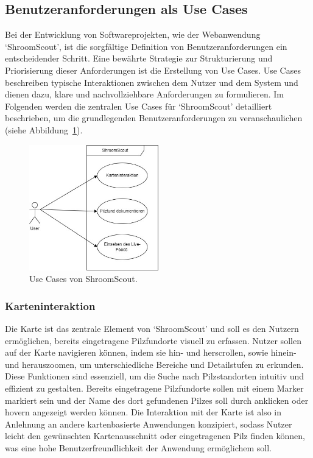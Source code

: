 \documentclass[../main.tex]{subfiles} %
\begin{document}
\subsection{Benutzeranforderungen als Use Cases}

Bei der Entwicklung von Softwareprojekten, wie der Webanwendung `ShroomScout', ist die sorgfältige Definition von
Benutzeranforderungen ein entscheidender Schritt. Eine bewährte Strategie zur Strukturierung und Priorisierung dieser
Anforderungen ist die Erstellung von Use Cases. Use Cases beschreiben typische Interaktionen zwischen dem Nutzer und
dem System und dienen dazu, klare und nachvollziehbare Anforderungen zu formulieren. Im Folgenden werden die zentralen
Use Cases für `ShroomScout' detailliert beschrieben, um die grundlegenden Benutzeranforderungen zu veranschaulichen
(siehe Abbildung~\ref{fig:UseCase_Diagramm}).

\begin{figure}[ht]
	\centering
	\includegraphics[width=0.5\textwidth]{abbildungen/UseCaseDiagrammDrawio.jpg}
	\caption{Use Cases von ShroomScout.}
	\label{fig:UseCase_Diagramm}
\end{figure}

\subsubsection{Karteninteraktion}

Die Karte ist das zentrale Element von `ShroomScout' und soll es den Nutzern ermöglichen, bereits eingetragene Pilzfundorte
visuell zu erfassen. Nutzer sollen auf der Karte navigieren können, indem sie hin- und herscrollen, sowie hinein- und herauszoomen,
um unterschiedliche Bereiche und Detailstufen zu erkunden. Diese Funktionen sind essenziell, um die Suche nach Pilzstandorten
intuitiv und effizient zu gestalten. Bereits eingetragene Pilzfundorte sollen mit einem Marker markiert sein und der Name des
dort gefundenen Pilzes soll durch anklicken oder hovern angezeigt werden können. Die Interaktion mit der Karte ist also in
Anlehnung an andere kartenbasierte Anwendungen konzipiert, sodass Nutzer leicht den gewünschten Kartenausschnitt oder
eingetragenen Pilz finden können, was eine hohe Benutzerfreundlichkeit der Anwendung ermöglichem soll.
\end{document}
